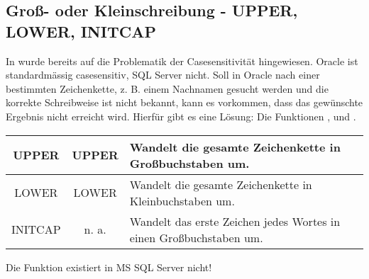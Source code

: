 \subsection{Groß- oder Kleinschreibung - UPPER, LOWER, INITCAP}
In  wurde bereits auf die Problematik der Casesensitivität hingewiesen. Oracle ist standardmässig casesensitiv, SQL Server nicht. Soll in Oracle nach einer bestimmten Zeichenkette, z. B. einem Nachnamen gesucht werden und die korrekte Schreibweise ist nicht bekannt, kann es vorkommen, dass das gewünschte Ergebnis nicht erreicht wird. Hierfür gibt es eine Lösung: Die Funktionen ,  und .
\begin{center}
    \label{srfstringfct1}
    \begin{small}
        \tabletail{
            \hline
        }
        \tablelasttail {
            \hline
        }
        \begin{supertabular}{|c|c|p{11cm}|}
            UPPER & UPPER& Wandelt die gesamte Zeichenkette in Großbuchstaben um.\\
            \hline
            LOWER & LOWER & Wandelt die gesamte Zeichenkette in Kleinbuchstaben um.\\
            \hline
            INITCAP & n. a.& Wandelt das erste Zeichen jedes Wortes in einen Großbuchstaben um.\\
        \end{supertabular}
    \end{small}
\end{center}
\clearpage
\begin{merke}
    Die Funktion  existiert in MS SQL Server nicht!
\end{merke}

